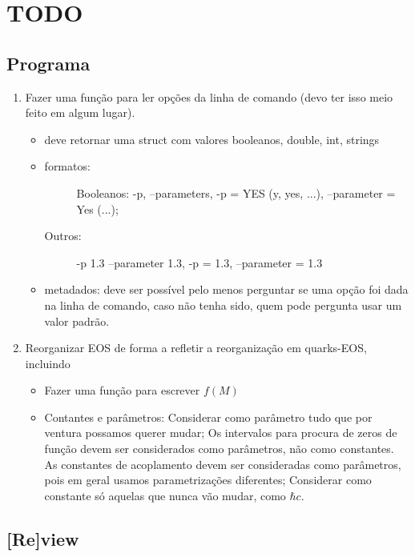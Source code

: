 \chapter{TODO}

\section{Programa}

\begin{enumerate}
\item Fazer uma função para ler opções da linha de comando (devo ter isso meio feito em algum lugar).
	\begin{itemize}
	\item deve retornar uma struct com valores booleanos, double, int, strings
	\item
		\begin{description}
			\item[formatos:] Booleanos: -p, --parameters, -p = YES (y, yes, ...), --parameter = Yes (...);
			\item[Outros:] -p 1.3 --parameter 1.3, -p = 1.3, --parameter = 1.3
		\end{description}
	\item metadados: deve ser possível pelo menos perguntar se uma opção foi dada na linha de comando, caso não tenha sido, quem pode pergunta usar um valor padrão.
	\end{itemize}
\item Reorganizar EOS de forma a refletir a reorganização em quarks-EOS, incluindo
	\begin{itemize}
		\item Fazer uma função para escrever $f(M)$
		\item Contantes e parâmetros: Considerar como parâmetro tudo que por ventura possamos querer mudar; Os intervalos para procura de zeros de função devem ser considerados como parâmetros, não como constantes. As constantes de acoplamento devem ser consideradas como parâmetros, pois em geral usamos parametrizações diferentes; Considerar como constante só aquelas que nunca vão mudar, como $\hbar c$.
	\end{itemize}
\end{enumerate}

\section{[Re]view}

